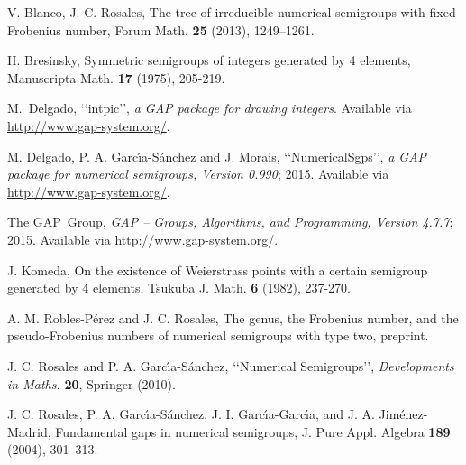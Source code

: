 \documentclass[11pt]{amsart}
\theoremstyle{remark}
\begin{document}
\begin{thebibliography}{100}

 V. Blanco, J. C. Rosales, The tree of irreducible numerical semigroups with fixed Frobenius number, Forum Math. \textbf{25} (2013), 1249--1261.

 H. Bresinsky,  Symmetric semigroups of integers generated by 4 elements,  Manuscripta Math. \textbf{17} (1975), 205-219.

 M.~Delgado,  \lq\lq intpic\rq\rq, \emph{a \textsf{GAP} package for drawing integers}. Available via \url{http://www.gap-system.org/}.

 M. Delgado, P. A. Garc\'{\i}a-S\'{a}nchez and J. Morais, \lq\lq NumericalSgps\rq\rq, \emph{a \textsf{GAP} package for numerical semigroups, Version 0.990}; 2015.  Available via \url{http://www.gap-system.org/}.

 The GAP~Group, \emph{GAP -- Groups, Algorithms, and Programming, Version 4.7.7}; 2015. Available via \url{http://www.gap-system.org/}.

 J. Komeda, On the existence of Weierstrass points with a certain semigroup generated by 4 elements, Tsukuba J. Math. \textbf{6} (1982), 237-270. 

 A. M. Robles-P\'{e}rez and J. C. Rosales, The genus, the Frobenius number, and the pseudo-Frobenius numbers of numerical semigroups with type two, preprint.

 J. C. Rosales and P. A. Garc\'{\i}a-S\'{a}nchez, \lq\lq Numerical Semigroups\rq\rq, \emph{Developments in Maths.} \textbf{20},
  Springer (2010).

 J. C. Rosales, P. A. Garc\'{\i}a-S\'{a}nchez, J. I. Garc\'{\i}a-Garc\'{\i}a, and J. A. Jim\'{e}nez-Madrid, Fundamental gaps in numerical semigroups, J. Pure Appl. Algebra \textbf{189} (2004), 301--313.

\end{thebibliography}
\end{document}
